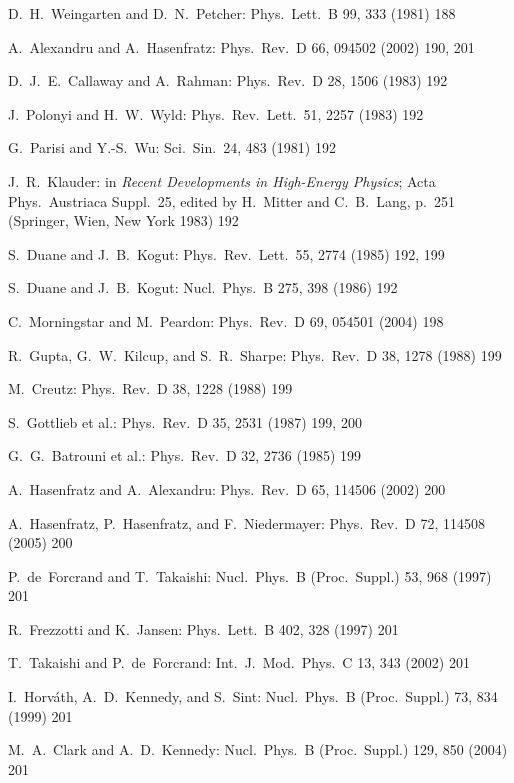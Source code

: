 \begin{enumerate}[label={[\arabic*]}]
  \item D.~H.~Weingarten and D.~N.~Petcher: Phys.\ Lett.\ B 99, 333 (1981) 188
  \item A.~Alexandru and A.~Hasenfratz: Phys.\ Rev.\ D 66, 094502 (2002) 190, 201
  \item D.~J.~E.~Callaway and A.~Rahman: Phys.\ Rev.\ D 28, 1506 (1983) 192
  \item J.~Polonyi and H.~W.~Wyld: Phys.\ Rev.\ Lett.\ 51, 2257 (1983) 192
  \item G.~Parisi and Y.-S.~Wu: Sci.\ Sin.\ 24, 483 (1981) 192
  \item J.~R.~Klauder: in \emph{Recent Developments in High-Energy Physics};
        Acta Phys.\ Austriaca Suppl.\ 25, edited by H.~Mitter and C.~B.~Lang,
        p.~251 (Springer, Wien, New York 1983) 192
  \item S.~Duane and J.~B.~Kogut: Phys.\ Rev.\ Lett.\ 55, 2774 (1985) 192, 199
  \item S.~Duane and J.~B.~Kogut: Nucl.\ Phys.\ B 275, 398 (1986) 192
  \item C.~Morningstar and M.~Peardon: Phys.\ Rev.\ D 69, 054501 (2004) 198
  \item R.~Gupta, G.~W.~Kilcup, and S.~R.~Sharpe: Phys.\ Rev.\ D 38, 1278 (1988) 199
  \item M.~Creutz: Phys.\ Rev.\ D 38, 1228 (1988) 199
  \item S.~Gottlieb et al.: Phys.\ Rev.\ D 35, 2531 (1987) 199, 200
  \item G.~G.~Batrouni et al.: Phys.\ Rev.\ D 32, 2736 (1985) 199
  \item A.~Hasenfratz and A.~Alexandru: Phys.\ Rev.\ D 65, 114506 (2002) 200
  \item A.~Hasenfratz, P.~Hasenfratz, and F.~Niedermayer: Phys.\ Rev.\ D 72,
        114508 (2005) 200
  \item P.~de~Forcrand and T.~Takaishi: Nucl.\ Phys.\ B (Proc.\ Suppl.) 53,
        968 (1997) 201
  \item R.~Frezzotti and K.~Jansen: Phys.\ Lett.\ B 402, 328 (1997) 201
  \item T.~Takaishi and P.~de~Forcrand: Int.\ J.\ Mod.\ Phys.\ C 13, 343
        (2002) 201
  \item I.~Horv\'ath, A.~D.~Kennedy, and S.~Sint: Nucl.\ Phys.\ B (Proc.\
        Suppl.) 73, 834 (1999) 201
  \item M.~A.~Clark and A.~D.~Kennedy: Nucl.\ Phys.\ B (Proc.\ Suppl.) 129,
        850 (2004) 201

\end{enumerate}
